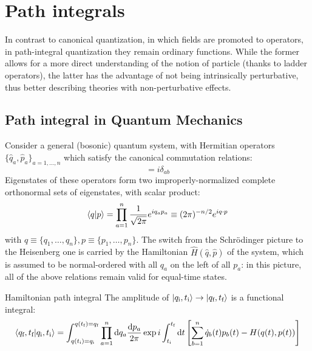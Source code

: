
\section{Path integrals}

In contrast to canonical quantization, in which fields are promoted to operators, in path-integral quantization they remain ordinary functions. While the former allows for a more direct understanding of the notion of particle (thanks to ladder operators), the latter has the advantage of not being intrinsically perturbative, thus better describing theories with non-perturbative effects.

\subsection{Path integral in Quantum Mechanics}

Consider a general (bosonic) quantum system, with Hermitian operators $ \{\hat{q}_a,\hat{p}_a\}_{a = 1,\dots,n} $ which satisfy the canonical commutation relations:
\begin{equation}
  [\hat{q}_a , \hat{p}_b] = i \delta_{ab}
  \label{eq:qm-path-int-comm}
\end{equation}
Eigenstates of these operators form two improperly-normalized complete orthonormal sets of eigenstates, with scalar product:
\begin{equation}
  \braket{q | p} = \prod_{a = 1}^n \frac{1}{\sqrt{2\pi}} e^{i q_a p_a} \equiv (2\pi)^{-n/2} e^{i q \cdot p}
  \label{qm-plane-wave}
\end{equation}
with $ q \equiv \{q_1 , \dots , q_n\} , p \equiv \{p_1 , \dots , p_n\} $. The switch from the Schrödinger picture to the Heisenberg one is carried by the Hamiltonian $ \hat{H}(\hat{q},\hat{p}) $ of the system, which is assumed to be normal-ordered with all $ q_a $ on the left of all $ p_a $: in this picture, all of the above relations remain valid for equal-time states.

\begin{theorem}{Hamiltonian path integral}{}
  The amplitude of $ \ket{q_\text{i},t_\text{i}} \rightarrow \ket{q_\text{f},t_\text{f}} $ is a functional integral:
  \begin{equation}
    \braket{q_\text{f},t_\text{f} | q_\text{i},t_\text{i}} = \int_{q(t_\text{i}) = q_\text{i}}^{q(t_\text{f}) = q_\text{f}} \prod_{a = 1}^n \mathrm{d} q_a \frac{\mathrm{d} p_a}{2\pi} \exp i \int_{t_\text{i}}^{t_\text{f}} \mathrm{d} t \left[ \sum_{b = 1}^n \dot{q}_b(t) p_b(t) - H(q(t),p(t)) \right]
    \label{eq:qm-ham-path-int}
  \end{equation}
\end{theorem}

